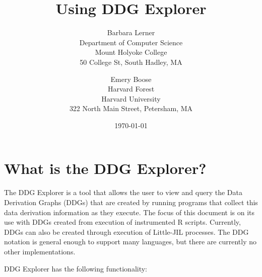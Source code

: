 \documentclass[12pt]{article}
\title{Using DDG Explorer}
\author{
        Barbara Lerner \\
                Department of Computer Science\\
        Mount Holyoke College\\
        50 College St, South Hadley, MA
            \and
        Emery Boose\\
        Harvard Forest\\
        Harvard University\\
        322 North Main Street, Petersham, MA \\
}
\date{\today}
\begin{document}
\maketitle

\newpage
\tableofcontents
\newpage
\section{What is the DDG Explorer?}
{\mdseries\upshape\color{black}
The DDG Explorer is a tool that allows the user to view and query the Data Derivation Graphs (DDGs) that are created by running programs that collect this data derivation information as they execute. The focus of this document is on its use with DDGs created from execution of instrumented R scripts. Currently, DDGs can also be created through execution of Little-JIL processes. The DDG notation is general enough to support many languages, but there are currently no other implementations.}

{\mdseries\upshape\color{black}
DDG Explorer has the following functionality:}
\end{document}
